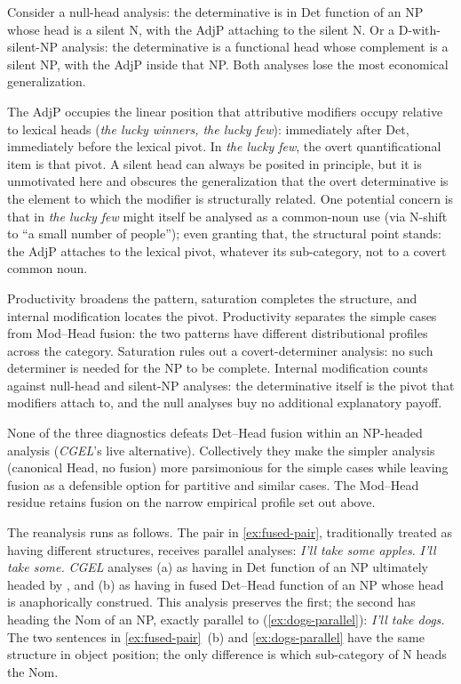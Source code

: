 \documentclass[12pt]{article}
\begin{document}
Consider a null-head analysis: the determinative is in Det function of an NP whose head is a silent N, with the AdjP attaching to the silent N. Or a D-with-silent-NP analysis: the determinative is a functional head whose complement is a silent NP, with the AdjP inside that NP. Both analyses lose the most economical generalization.

The AdjP occupies the linear position that attributive modifiers occupy relative to lexical heads (\textit{the lucky winners, the lucky few}): immediately after Det, immediately before the lexical pivot. In \textit{the lucky few}, the overt quantificational item is that pivot. A silent head can always be posited in principle, but it is unmotivated here and obscures the generalization that the overt determinative is the element to which the modifier is structurally related. One potential concern is that  in \textit{the lucky few} might itself be analysed as a common-noun use (via N-shift to \enquote{a small number of people}); even granting that, the structural point stands: the AdjP attaches to the lexical pivot, whatever its sub-category, not to a covert common noun.

Productivity broadens the pattern, saturation completes the structure, and internal modification locates the pivot. Productivity separates the simple cases from Mod--Head fusion: the two patterns have different distributional profiles across the category. Saturation rules out a covert-determiner analysis: no such determiner is needed for the NP to be complete. Internal modification counts against null-head and silent-NP analyses: the determinative itself is the pivot that modifiers attach to, and the null analyses buy no additional explanatory payoff.

None of the three diagnostics defeats Det--Head fusion within an NP-headed analysis (\textit{CGEL}'s live alternative). Collectively they make the simpler analysis (canonical Head, no fusion) more parsimonious for the simple cases while leaving fusion as a defensible option for partitive and similar cases. The Mod--Head residue retains fusion on the narrow empirical profile set out above.

The reanalysis runs as follows. The pair in \ref{ex:fused-pair}, traditionally treated as having different structures, receives parallel analyses:
\ea\label{ex:fused-pair}
\ea \textit{I'll take some apples.}
\ex \textit{I'll take some.}
\z
\z
\textit{CGEL} analyses (a) as having  in Det function of an NP ultimately headed by , and (b) as having  in fused Det--Head function of an NP whose head is anaphorically construed. This analysis preserves the first; the second has  heading the Nom of an NP, exactly parallel to (\ref{ex:dogs-parallel}):
\ea\label{ex:dogs-parallel}
\textit{I'll take dogs.}
\z
The two sentences in \ref{ex:fused-pair}~(b) and \ref{ex:dogs-parallel} have the same structure in object position; the only difference is which sub-category of N heads the Nom.
\end{document}

